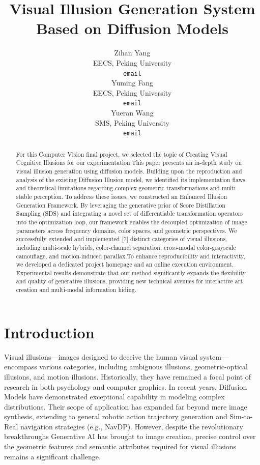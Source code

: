 \documentclass{article}
\title{Visual Illusion Generation System Based on Diffusion Models}
\author{%
  Zihan Yang \\
  EECS, Peking University \\
  \texttt{email} \\
  \And
  Yuming Fang \\
  EECS, Peking University \\
  \texttt{email} \\
  \And
  Yueran Wang \\
  SMS, Peking University \\
  \texttt{email} \\
}
\begin{document}
\maketitle


\begin{abstract}
  For this Computer Vision final project, we selected the topic of Creating Visual
  Cognitive Illusions for our experimentation.This paper presents an in-depth study on visual illusion generation using diffusion models. Building upon the reproduction and analysis of the existing Diffusion Illusion model, we identified its implementation flaws and theoretical limitations regarding complex geometric transformations and multi-stable perception. To address these issues, we constructed an Enhanced Illusion Generation Framework. By leveraging the generative prior of Score Distillation Sampling (SDS) and integrating a novel set of differentiable transformation operators into the optimization loop, our framework enables the decoupled optimization of image parameters across frequency domains, color spaces, and geometric perspectives. We successfully extended and implemented [7] distinct categories of visual illusions, including multi-scale hybrids, color-channel separation, cross-modal color-grayscale camouflage, and motion-induced parallax.To enhance reproducibility and interactivity, we developed a dedicated project homepage and an online execution environment. Experimental results demonstrate that our method significantly expands the flexibility and quality of generative illusions, providing new technical avenues for interactive art creation and multi-modal information hiding.
  
\end{abstract}


\section{Introduction}

Visual illusions—images designed to deceive the human visual system—encompass various categories, including ambiguous illusions, geometric-optical illusions, and motion illusions. Historically, they have remained a focal point of research in both psychology and computer graphics. In recent years, Diffusion Models have demonstrated exceptional capability in modeling complex distributions. Their scope of application has expanded far beyond mere image synthesis, extending to general robotic action trajectory generation\cite{chi2025diffusion} and Sim-to-Real navigation strategies (e.g., NavDP\cite{cai2025navdp}). However, despite the revolutionary breakthroughs Generative AI has brought to image creation, precise control over the geometric features and semantic attributes required for visual illusions remains a significant challenge.
\end{document}
